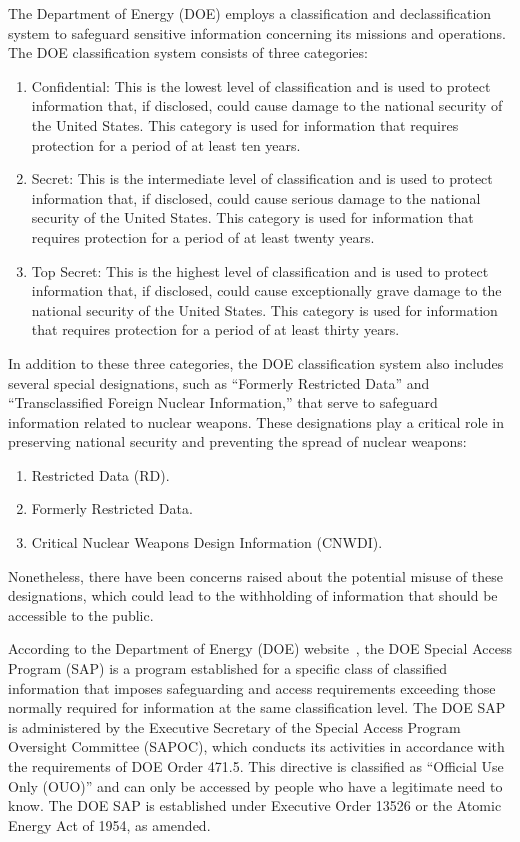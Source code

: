 The Department of Energy (DOE) employs a classification and declassification system to safeguard sensitive information concerning
its missions and operations. The DOE classification system consists of three categories:
\begin{enumerate}
\item
Confidential: This is the lowest level of classification and is used to protect information that, if disclosed, could cause damage to the national security of the United States. This category is used for information that requires protection for a period of at least ten years.

\item
Secret: This is the intermediate level of classification and is used to protect information that, if disclosed, could cause serious damage to the national security of the United States. This category is used for information that requires protection for a period of at least twenty years.

\item
Top Secret: This is the highest level of classification and is used to protect information that, if disclosed, could cause exceptionally grave damage to the national security of the United States. This category is used for information that requires protection for a period of at least thirty years.
\end{enumerate}
In addition to these three categories, the DOE classification system also includes several special designations, such as ``Formerly Restricted Data'' and ``Transclassified Foreign Nuclear Information,'' that serve to safeguard information related to nuclear weapons. These designations play a critical role in preserving national security and preventing the spread of nuclear weapons:
\begin{enumerate}
\item
Restricted Data (RD).

\item
Formerly Restricted Data.

\item
Critical Nuclear Weapons Design Information (CNWDI).
\end{enumerate}
Nonetheless, there have been concerns raised about the potential misuse of these designations, which could lead to the withholding of information that should be accessible to the public.

According to the Department of Energy (DOE) website~\cite{DOEHFMSP22}, the DOE Special Access Program (SAP)
is a program established for a specific class of classified information that imposes
safeguarding and access requirements exceeding those normally required for information at the same classification level.
The DOE SAP is administered by the Executive Secretary of the Special Access Program Oversight Committee (SAPOC),
which conducts its activities in accordance with the requirements of DOE Order 471.5.
This directive is classified as ``Official Use Only (OUO)'' and can
only be accessed by people who have a legitimate need to know.
The DOE SAP is established under Executive Order 13526 or the Atomic Energy Act of 1954, as amended.



